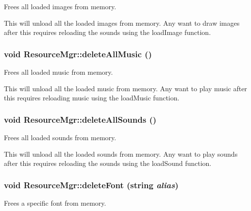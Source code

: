 Frees all loaded images from memory. 

This will unload all the loaded images from memory. Any want to draw images after this requires reloading the sounds using the loadImage function. \hypertarget{class_resource_mgr_8e5158a10ed4fb6488e6f4245645c546}{
\subsubsection[{deleteAllMusic}]{\setlength{\rightskip}{0pt plus 5cm}void ResourceMgr::deleteAllMusic ()}}
\label{class_resource_mgr_8e5158a10ed4fb6488e6f4245645c546}


Frees all loaded music from memory. 

This will unload all the loaded music from memory. Any want to play music after this requires reloading music using the loadMusic function. \hypertarget{class_resource_mgr_392062943a324c74e3b4eae021dd0f17}{
\subsubsection[{deleteAllSounds}]{\setlength{\rightskip}{0pt plus 5cm}void ResourceMgr::deleteAllSounds ()}}
\label{class_resource_mgr_392062943a324c74e3b4eae021dd0f17}


Frees all loaded sounds from memory. 

This will unload all the loaded sounds from memory. Any want to play sounds after this requires reloading the sounds using the loadSound function. \hypertarget{class_resource_mgr_5c4a5772b6afa45af23170b0dc53c9d7}{
\subsubsection[{deleteFont}]{\setlength{\rightskip}{0pt plus 5cm}void ResourceMgr::deleteFont (string {\em alias})}}
\label{class_resource_mgr_5c4a5772b6afa45af23170b0dc53c9d7}


Frees a specific font from memory. 

